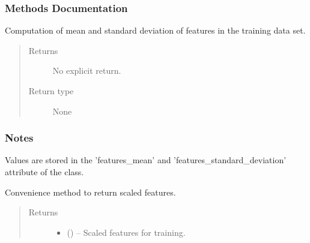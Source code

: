 \documentclass[letterpaper,10pt,english]{sphinxmanual}
\begin{document}
\begin{fulllineitems}
\subsubsection*{Methods Documentation}

\begin{fulllineitems}
\label{\detokenize{api/ucf.TrainingDataSets:ucf.TrainingDataSets.compute_mean_and_standard_deviation}}
Computation of mean and standard deviation of features
in the training data set.
\begin{quote}\begin{description}
\item[{Returns}] \leavevmode
No explicit return.

\item[{Return type}] \leavevmode
None

\end{description}\end{quote}
\subsubsection*{Notes}

Values are stored in the 'features\_mean' and
'features\_standard\_deviation' attribute of the class.

\end{fulllineitems}


\begin{fulllineitems}
\label{\detokenize{api/ucf.TrainingDataSets:ucf.TrainingDataSets.get_scaled_features}}
Convenience method to return scaled features.
\begin{quote}\begin{description}
\item[{Returns}] \leavevmode
\begin{itemize}
\item {} 
 () -- Scaled features for training.


\end{itemize}
\end{description}
\end{quote}
\end{fulllineitems}
\end{fulllineitems}
\end{document}
